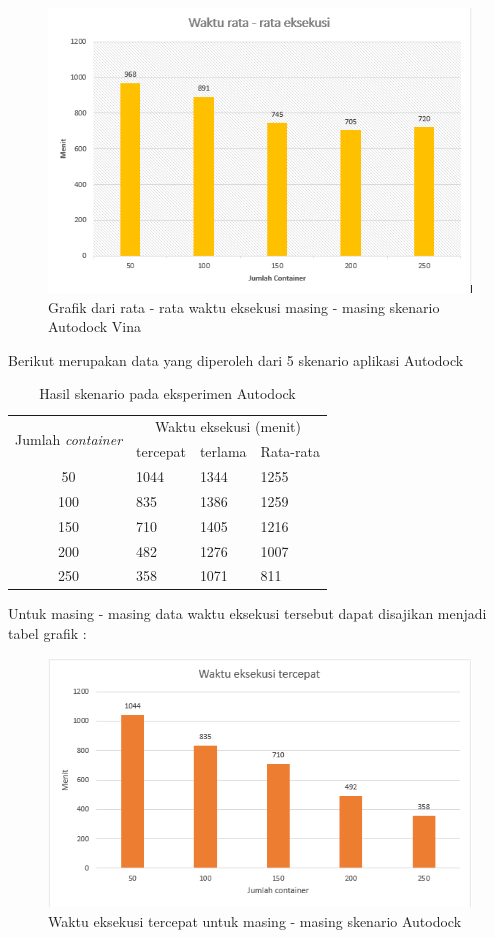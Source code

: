 \begin{figure}
	\includegraphics{ratarata_vina.PNG}
	\caption{Grafik dari rata - rata waktu eksekusi masing - masing skenario Autodock Vina}
\end{figure}

Berikut merupakan data yang diperoleh dari 5 skenario aplikasi Autodock 
\begin{table}
	\centering
	\begin{tabular}{|c|l|l|l|}
		\hline
		\multirow{2}{*}{Jumlah \textit{container}} & \multicolumn{3}{c|}{Waktu eksekusi (menit)} \\ \cline{2-4} 
		& \multicolumn{1}{c|}{tercepat} & \multicolumn{1}{c|}{terlama} & \multicolumn{1}{c|}{Rata-rata} \\ \hline
		50 & 1044 & 1344 & 1255 \\ \hline
		100 & 835 & 1386 & 1259 \\ \hline
		150 & 710 & 1405 & 1216 \\ \hline
		200 & 482 & 1276 & 1007 \\ \hline
		250 & 358 & 1071 & 811 \\ \hline
	\end{tabular}
	\caption{Hasil skenario pada eksperimen Autodock}
	\label{my-label}
\end{table}

Untuk masing - masing data waktu eksekusi tersebut dapat disajikan menjadi tabel grafik :

\begin{figure}
	\centering
	\includegraphics{tercepat_dock.PNG}
	\caption{Waktu eksekusi tercepat untuk masing - masing skenario Autodock}
\end{figure}

